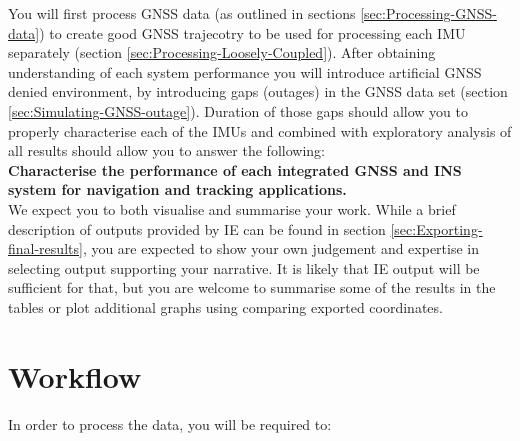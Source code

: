 \documentclass[british]{book}
\begin{document}
You will first process GNSS data (as outlined in sections \ref{sec:Processing-GNSS-data}) to create good GNSS trajecotry to be used for processing each IMU separately (section \ref{sec:Processing-Loosely-Coupled}). After obtaining understanding of each system performance you will introduce artificial GNSS denied environment, by introducing gaps (outages) in the GNSS data set (section \ref{sec:Simulating-GNSS-outage}). Duration of those gaps should allow you to properly characterise each of the IMUs and combined with exploratory analysis of all results should allow you to answer the following:\\
\textbf{Characterise the performance of each integrated GNSS and INS system for navigation and tracking applications.}\\
We expect you to both visualise and summarise your work. While a brief description of outputs provided by IE can be found in section \ref{sec:Exporting-final-results}, you are expected to show your own judgement and expertise in selecting output supporting your narrative. It is likely that IE output will be sufficient for that, but you are welcome to summarise some of the results in the tables or plot additional graphs using comparing exported coordinates.






\section{Workflow}
In order to process the data, you will be required to:
\end{document}

